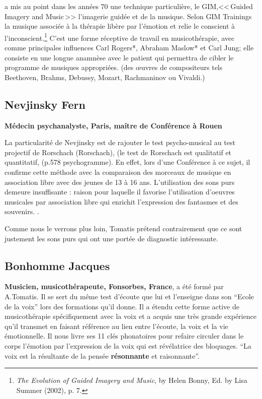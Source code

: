 a mis au point dans les années 70
une technique particulière, le GIM,<<\,Guided Imagery and Music\,>>
l'imagerie guidée et de la musique. Selon GIM
Trainings \autocite{gim_site} la
musique associée à la thérapie libère par l'émotion et relie le
conscient à l'inconscient.\footnote{\textsl{The Evolution of Guided Imagery and Music}, 
	by Helen Bonny, Ed. by Lisa Summer (2002), p. 7.}
 C'est une forme réceptive de travail
en musicothérapie, avec comme principales influences Carl Rogers*, Abraham Maslow* et Carl Jung; 
elle  consiste en une longue anamnèse avec le
patient qui permettra de cibler le programme de musiques appropriées. 
(des \oe uvres de compositeurs tels Beethoven, Brahms, Debussy,
Mozart, Rachmaninov ou Vivaldi.)






\subsection{ Nevjinsky Fern}
\textbf{Médecin psychanalyste, 
  Paris, maître de Conférence à Rouen}

 La particularité de Nevjinsky est de rajouter le test psycho-musical
 au test projectif de Rorschach (\gls{Rorschach}), (le test de
 Rorschach est qualitatif et quantitatif, (p.578 psychogramme).
 En effet, lors d'une
 Conférence à ce sujet, il confirme cette méthode 
 avec la comparaison des morceaux de musique en association libre avec
 des jeunes de 13 à 16 ans. 
 L'utilisation des sons purs demeure insuffisante : raison pour
 laquelle il favorise l'utilisation d'oeuvres musicales par
 association libre qui enrichit l'expression des fantasmes et des
 souvenirs.
\autocite[Fern Nevjinsky, maître de conférences à l'Université de Rouen, musicien, psycho-analyste. 
``\textit{Comparaison des modalités de projection et d'expression au test de Rorschach et à un test psycho-musical pour des adolescents de 13 à 16 ans}''.]{nevjinsky:adolescence}.  

 Comme nous le verrons plus loin, Tomatis prétend contrairement que ce sont justement les sons purs
qui ont une portée de diagnostic intéressante.

  \subsection{ Bonhomme Jacques } 
  \textbf{Musicien, musicothérapeute,
    Fonsorbes, France}, a été formé par A.Tomatis. Il se sert du même test d'écoute
      que lui et l'enseigne dans son ``Ecole de la voix'' lors des
      formations qu'il donne. Il a étendu cette  forme active de musicothérapie
      spécifiquement avec la voix 
     et a acquis une
      très grande expérience qu'il transmet en   
      faisant référence au lien entre l'écoute, la voix et la vie
      émotionnelle.
      Il nous livre ses 11 clés phonatoires pour refaire circuler dans
      le corps 
      l'émotion par l'expression de la voix qui est révélatrice des bloquages.
``La voix est la
      résultante de la pensée \textbf{résonnante}  et raisonnante''.
     
